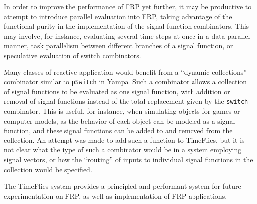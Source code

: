 In order to improve the performance of FRP yet further, it may be productive to attempt
to introduce parallel evaluation into FRP, taking advantage of the functional purity in
the implementation of the signal function combinators. This may involve, for instance,
evaluating several time-steps at once in a data-parallel manner, task parallelism
between different branches of a signal function, or speculative evaluation of switch
combinators.

Many classes of reactive application would benefit from a ``dynamic collections'' combinator
similar to {\tt pSwitch} in Yampa. Such a combinator allows a collection of signal functions
to be evaluated as one signal function, with addition or removal of signal functions instead
of the total replacement given by the {\tt switch} combinator. This is useful, for instance,
when simulating objects for games or computer models, as the behavior of each object can be
modeled as a signal function, and these signal functions can be added to and removed from the
collection. An attempt was made to add such a function to TimeFlies, but it is not clear what 
the type of such a combinator would be in a system employing signal vectors, or how the
``routing'' of inputs to individual signal functions in the collection would be specified.

The TimeFlies system provides a principled and performant system for future experimentation
on FRP, as well as implementation of FRP applications.
